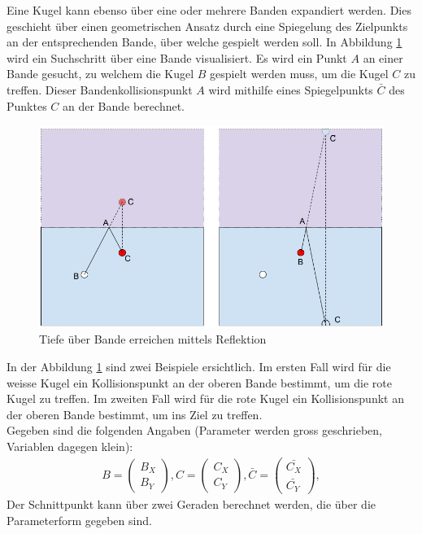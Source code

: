 Eine Kugel kann ebenso über eine oder mehrere Banden expandiert werden. Dies geschieht über einen
geometrischen Ansatz durch eine Spiegelung\cite{math.stackexchange:1}
des Zielpunkts an der entsprechenden Bande, über welche gespielt werden soll. In Abbildung \ref{fig:Tiefe über Bande erreichen mittels Reflektion}
wird ein Suchschritt über eine Bande visualisiert. Es wird ein Punkt $A$ an einer Bande gesucht, zu welchem die Kugel $B$
gespielt werden muss, um die Kugel $C$ zu treffen. Dieser Bandenkollisionspunkt $A$ wird mithilfe eines Spiegelpunkts $\bar{C}$
des Punktes $C$ an der Bande berechnet.
\begin{figure}[h!]
    \begin{center}
        \includegraphics[width=0.5\linewidth]{../common/03_billiard_ai/resources/47_rail_reflection_1.png}
    \end{center}
    \caption{Tiefe über Bande erreichen mittels Reflektion}
    \label{fig:Tiefe über Bande erreichen mittels Reflektion}
\end{figure}
In der Abbildung \ref{fig:Tiefe über Bande erreichen mittels Reflektion} sind zwei Beispiele ersichtlich.
Im ersten Fall wird für die weisse Kugel ein Kollisionspunkt an der oberen Bande bestimmt, um die rote Kugel zu treffen.
Im zweiten Fall wird für die rote Kugel ein Kollisionspunkt an der oberen Bande bestimmt, um ins Ziel zu treffen.\\
Gegeben sind die folgenden Angaben (Parameter werden gross geschrieben, Variablen dagegen klein):
\begin{align}
    B = \begin{pmatrix}B_X\\B_Y\end{pmatrix},
    C = \begin{pmatrix}C_X\\C_Y\end{pmatrix},
    \bar{C} = \begin{pmatrix}\bar{C_X}\\\bar{C_Y}\end{pmatrix},
\end{align}
Der Schnittpunkt kann über zwei Geraden berechnet werden, die über die Parameterform gegeben sind.
